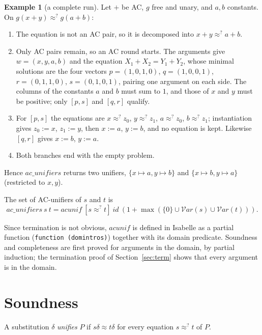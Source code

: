 \documentclass[11pt,a4paper]{article}
\theoremstyle{definition}
\newtheorem{example}[theorem]{Example}
\theoremstyle{remark}
\newcommand{\isa}[1]{\mbox{\small\texttt{#1}}}
\newcommand{\vars}{\mathcal{V}\mathit{ar}}
\newcommand{\eqAC}{\approx}
\begin{document}
\begin{example}[a complete run]\label{ex:run}
  Let $+$ be AC, $g$ free and unary, and $a, b$ constants. On $g(x + y) \approx^? g(a + b)$:
  \begin{enumerate}[nosep,leftmargin=*]
    \item The equation is not an AC pair, so it is decomposed into $x + y \approx^? a + b$.
    \item Only AC pairs remain, so an AC round starts. The arguments give $w = (x, y, a, b)$ and
          the equation $X_1 + X_2 = Y_1 + Y_2$, whose minimal solutions are the four vectors
          $p = (1,0,1,0)$, $q = (1,0,0,1)$, $r = (0,1,1,0)$, $s = (0,1,0,1)$, pairing one
          argument on each side. The columns of the constants $a$ and $b$ must sum to $1$, and
          those of $x$ and $y$ must be positive; only $[p, s]$ and $[q, r]$ qualify.
    \item For $[p, s]$ the equations are $x \approx^? z_0$, $y \approx^? z_1$, $a \approx^? z_0$,
          $b \approx^? z_1$; instantiation gives $z_0 := x$, $z_1 := y$, then $x := a$, $y := b$,
          and no equation is kept. Likewise $[q, r]$ gives $x := b$, $y := a$.
    \item Both branches end with the empty problem.
  \end{enumerate}
  Hence $\mathit{ac\_unifiers}$ returns two unifiers, $\{x \mapsto a, y \mapsto b\}$ and
  $\{x \mapsto b, y \mapsto a\}$ (restricted to $x, y$).
\end{example} The set of AC-unifiers of $s$ and $t$ is
\[
  \mathit{ac\_unifiers}\ s\ t = \mathit{acunif}\ [s \approx^? t]\ \mathit{id}\ (1 + \max(\{0\}\cup\vars(s)\cup\vars(t))).
\]

Since termination is not obvious, $\mathit{acunif}$ is defined in Isabelle as a partial function
(\isa{function (domintros)}) together with its domain predicate. Soundness and completeness are
first proved for arguments in the domain, by partial induction; the termination proof of
Section~\ref{sec:term} shows that every argument is in the domain.

\section{Soundness}\label{sec:sound}

A substitution $\delta$ \emph{unifies} $P$ if $s\delta \eqAC t\delta$ for every equation
$s \approx^? t$ of $P$.
\end{document}
